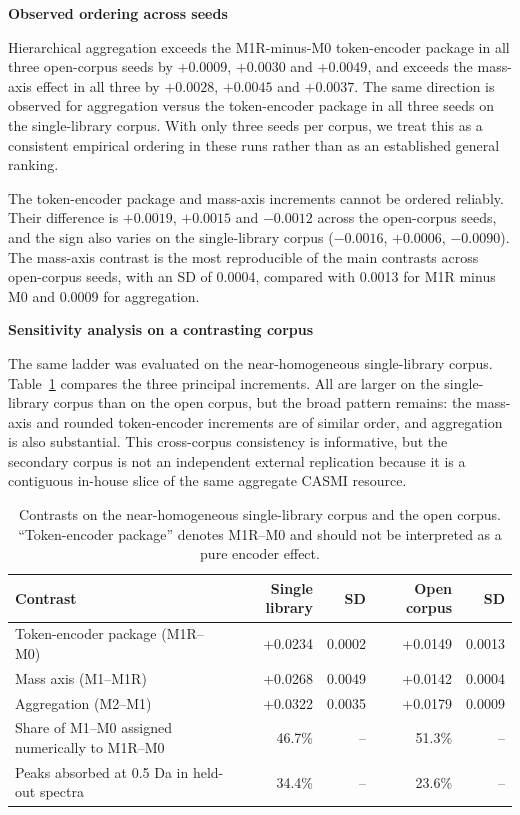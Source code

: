 \documentclass[11pt]{article}
\newcommand{\hd}[1]{\medskip\par\noindent\textbf{#1}\par\nobreak\vspace{2pt}\noindent\ignorespaces}
\begin{document}
\hd{Observed ordering across seeds}
Hierarchical aggregation exceeds the M1R-minus-M0 token-encoder package in all three open-corpus seeds by $+0.0009$, $+0.0030$ and $+0.0049$, and exceeds the mass-axis effect in all three by $+0.0028$, $+0.0045$ and $+0.0037$. The same direction is observed for aggregation versus the token-encoder package in all three seeds on the single-library corpus. With only three seeds per corpus, we treat this as a consistent empirical ordering in these runs rather than as an established general ranking.

The token-encoder package and mass-axis increments cannot be ordered reliably. Their difference is $+0.0019$, $+0.0015$ and $-0.0012$ across the open-corpus seeds, and the sign also varies on the single-library corpus ($-0.0016$, $+0.0006$, $-0.0090$). The mass-axis contrast is the most reproducible of the main contrasts across open-corpus seeds, with an SD of 0.0004, compared with 0.0013 for M1R minus M0 and 0.0009 for aggregation.

\hd{Sensitivity analysis on a contrasting corpus}
The same ladder was evaluated on the near-homogeneous single-library corpus. Table~\ref{tab:corpora} compares the three principal increments. All are larger on the single-library corpus than on the open corpus, but the broad pattern remains: the mass-axis and rounded token-encoder increments are of similar order, and aggregation is also substantial. This cross-corpus consistency is informative, but the secondary corpus is not an independent external replication because it is a contiguous in-house slice of the same aggregate CASMI resource.

\begin{table}[ht]
\centering
\caption{Contrasts on the near-homogeneous single-library corpus and the open corpus. ``Token-encoder package'' denotes M1R--M0 and should not be interpreted as a pure encoder effect.}
\label{tab:corpora}
\small
\begin{tabular}{lrrrr}
\toprule
Contrast & Single library & SD & Open corpus & SD\\
\midrule
Token-encoder package (M1R--M0) & +0.0234 & 0.0002 & +0.0149 & 0.0013\\
Mass axis (M1--M1R) & +0.0268 & 0.0049 & +0.0142 & 0.0004\\
Aggregation (M2--M1) & +0.0322 & 0.0035 & +0.0179 & 0.0009\\
Share of M1--M0 assigned numerically to M1R--M0 & 46.7\% & -- & 51.3\% & --\\
Peaks absorbed at 0.5 Da in held-out spectra & 34.4\% & -- & 23.6\% & --\\
\bottomrule
\end{tabular}
\end{table}
\end{document}
